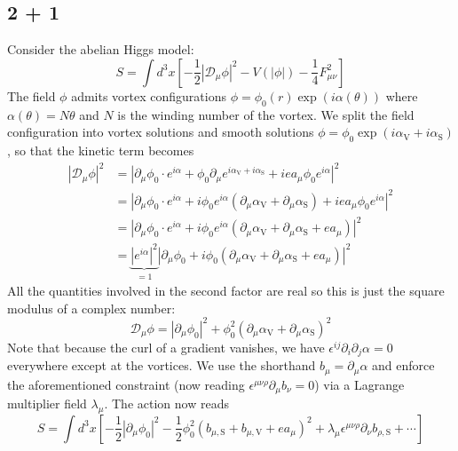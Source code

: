 \documentclass{report}
\begin{document}


\subsection{2 + 1}
 Consider the abelian Higgs model:
\begin{equation*}
	S = \int d^3 x \left[
		- \frac{1}{2} |\mathcal{D}_\mu \phi|^2
			- V(|\phi|) - \frac{1}{4} F_{\mu\nu}^2
	\right]
\end{equation*}
The field $ \phi $ admits vortex configurations $ \phi = \phi_0(r)
\exp(i\alpha(\theta)) $ where $ \alpha(\theta) = N\theta $ and $ N $ is the
winding number of the vortex. 
We split the field configuration into vortex solutions and smooth solutions 
$ \phi = \phi_0 \exp(i\alpha_{\text{V}} + i \alpha_{\text{S}}) $, so that 
the kinetic term becomes 
\begin{align*}
	|\mathcal{D}_\mu \phi|^2
		&= |\partial_\mu \phi_0 \cdot e^{i\alpha} 
			+ \phi_0 \partial_\mu e^{i\alpha_{\text{V}} + i\alpha_{\text{S}}}
			+ ie a_\mu \phi_0 e^{i\alpha}|^2\\
		&= |\partial_\mu \phi_0\cdot e^{i\alpha}
		 	+ i\phi_0 e^{i\alpha}(\partial_\mu \alpha_{\text{V}} 
			+ \partial_\mu \alpha_{\text{S}}) + iea_\mu \phi_0 e^{i\alpha}|^2\\
		&= |\partial_\mu \phi_0 \cdot e^{i\alpha}
		 	+ i\phi_0 e^{i\alpha}(\partial_\mu \alpha_{\text{V}} 
			+ \partial_\mu \alpha_{\text{S}} + ea_\mu)|^2\\
		&= \underbrace{|e^{i\alpha}|^2}_{=1}
		  |\partial_\mu \phi_0
		 	+ i\phi_0 (\partial_\mu \alpha_{\text{V}} 
			+ \partial_\mu \alpha_{\text{S}} + ea_\mu)|^2
\end{align*}
All the quantities involved in the second factor are real so this is just 
the square modulus of a complex number: 
\begin{equation*}
	\mathcal{D}_\mu \phi 
		= |\partial_\mu\phi_0|^2 + \phi_0^2 
			\left(\partial_\mu \alpha_{\text{V}} + \partial_\mu \alpha_{\text{S}}\right)^2
\end{equation*}
Note that because the curl of a gradient vanishes, we have $ \epsilon^{ij}\partial_i 
\partial_j \alpha = 0 $ everywhere except at the vortices. We use the shorthand 
$ b_\mu = \partial_\mu \alpha $ and enforce the aforementioned constraint
(now reading $ \epsilon^{\mu\nu\rho} \partial_\mu b_\nu = 0$) via a Lagrange
multiplier field $ \lambda_\mu $. The action now reads 
\begin{equation}\label{eq:abelian-higgs-action}
	S  = \int d^3 x \left[
		- \frac{1}{2} |\partial_\mu \phi_0|^2 
		- \frac{1}{2} \phi_0^2 \left(
			b_{\mu, \text{S}} + b_{\mu, \text{V}}
				+ ea_\mu
		\right)^2 
		+ \lambda_\mu \epsilon^{\mu\nu\rho} \partial_\nu b_{\rho, \text{S}}
		+ \cdots
	\right]
\end{equation}
\end{document}
